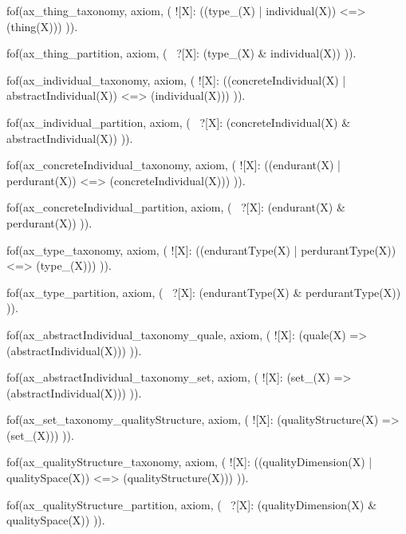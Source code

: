 


fof(ax_thing_taxonomy, axiom, (
  ![X]: ((type_(X) | individual(X)) <=> (thing(X)))
)).

fof(ax_thing_partition, axiom, (
  ~?[X]: (type_(X) & individual(X))
)).


fof(ax_individual_taxonomy, axiom, (
  ![X]: ((concreteIndividual(X) | abstractIndividual(X)) <=> (individual(X)))
)).

fof(ax_individual_partition, axiom, (
  ~?[X]: (concreteIndividual(X) & abstractIndividual(X))
)).


fof(ax_concreteIndividual_taxonomy, axiom, (
  ![X]: ((endurant(X) | perdurant(X)) <=> (concreteIndividual(X)))
)).

fof(ax_concreteIndividual_partition, axiom, (
  ~?[X]: (endurant(X) & perdurant(X))
)).


fof(ax_type_taxonomy, axiom, (
  ![X]: ((endurantType(X) | perdurantType(X)) <=> (type_(X)))
)).

fof(ax_type_partition, axiom, (
  ~?[X]: (endurantType(X) & perdurantType(X))
)).




fof(ax_abstractIndividual_taxonomy_quale, axiom, (
  ![X]: (quale(X) => (abstractIndividual(X)))
)).

fof(ax_abstractIndividual_taxonomy_set, axiom, (
  ![X]: (set_(X) => (abstractIndividual(X)))
)).


fof(ax_set_taxonomy_qualityStructure, axiom, (
  ![X]: (qualityStructure(X) => (set_(X)))
)).


fof(ax_qualityStructure_taxonomy, axiom, (
  ![X]: ((qualityDimension(X) | qualitySpace(X)) <=> (qualityStructure(X)))
)).

fof(ax_qualityStructure_partition, axiom, (
  ~?[X]: (qualityDimension(X) & qualitySpace(X))
)).

